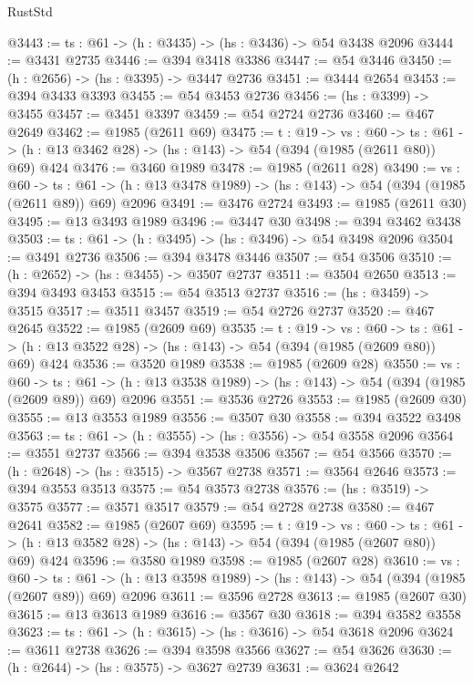 \begin{lexlean}{RustStd}
\begin{coremodule}
{\begin{coremodule}
{{{{{{{{@3443 := {ts : @61} -> (h : @3435) -> (hs : @3436) -> @54 @3438 @2096
@3444 := @3431 @2735
@3446 := @394 @3418 @3386
@3447 := @54 @3446
@3450 := (h : @2656) -> (hs : @3395) -> @3447 @2736
@3451 := @3444 @2654
@3453 := @394 @3433 @3393
@3455 := @54 @3453 @2736
@3456 := (hs : @3399) -> @3455
@3457 := @3451 @3397
@3459 := @54 @2724 @2736
@3460 := @467 @2649
@3462 := @1985 (@2611 @69)
@3475 := {t : @19} ->
  {vs : @60} ->
  {ts : @61} -> (h : @13 @3462 @28) -> (hs : @143) -> @54 (@394 (@1985 (@2611 @80)) @69) @424
@3476 := @3460 @1989
@3478 := @1985 (@2611 @28)
@3490 := {vs : @60} ->
  {ts : @61} -> (h : @13 @3478 @1989) -> (hs : @143) -> @54 (@394 (@1985 (@2611 @89)) @69) @2096
@3491 := @3476 @2724
@3493 := @1985 (@2611 @30)
@3495 := @13 @3493 @1989
@3496 := @3447 @30
@3498 := @394 @3462 @3438
@3503 := {ts : @61} -> (h : @3495) -> (hs : @3496) -> @54 @3498 @2096
@3504 := @3491 @2736
@3506 := @394 @3478 @3446
@3507 := @54 @3506
@3510 := (h : @2652) -> (hs : @3455) -> @3507 @2737
@3511 := @3504 @2650
@3513 := @394 @3493 @3453
@3515 := @54 @3513 @2737
@3516 := (hs : @3459) -> @3515
@3517 := @3511 @3457
@3519 := @54 @2726 @2737
@3520 := @467 @2645
@3522 := @1985 (@2609 @69)
@3535 := {t : @19} ->
  {vs : @60} ->
  {ts : @61} -> (h : @13 @3522 @28) -> (hs : @143) -> @54 (@394 (@1985 (@2609 @80)) @69) @424
@3536 := @3520 @1989
@3538 := @1985 (@2609 @28)
@3550 := {vs : @60} ->
  {ts : @61} -> (h : @13 @3538 @1989) -> (hs : @143) -> @54 (@394 (@1985 (@2609 @89)) @69) @2096
@3551 := @3536 @2726
@3553 := @1985 (@2609 @30)
@3555 := @13 @3553 @1989
@3556 := @3507 @30
@3558 := @394 @3522 @3498
@3563 := {ts : @61} -> (h : @3555) -> (hs : @3556) -> @54 @3558 @2096
@3564 := @3551 @2737
@3566 := @394 @3538 @3506
@3567 := @54 @3566
@3570 := (h : @2648) -> (hs : @3515) -> @3567 @2738
@3571 := @3564 @2646
@3573 := @394 @3553 @3513
@3575 := @54 @3573 @2738
@3576 := (hs : @3519) -> @3575
@3577 := @3571 @3517
@3579 := @54 @2728 @2738
@3580 := @467 @2641
@3582 := @1985 (@2607 @69)
@3595 := {t : @19} ->
  {vs : @60} ->
  {ts : @61} -> (h : @13 @3582 @28) -> (hs : @143) -> @54 (@394 (@1985 (@2607 @80)) @69) @424
@3596 := @3580 @1989
@3598 := @1985 (@2607 @28)
@3610 := {vs : @60} ->
  {ts : @61} -> (h : @13 @3598 @1989) -> (hs : @143) -> @54 (@394 (@1985 (@2607 @89)) @69) @2096
@3611 := @3596 @2728
@3613 := @1985 (@2607 @30)
@3615 := @13 @3613 @1989
@3616 := @3567 @30
@3618 := @394 @3582 @3558
@3623 := {ts : @61} -> (h : @3615) -> (hs : @3616) -> @54 @3618 @2096
@3624 := @3611 @2738
@3626 := @394 @3598 @3566
@3627 := @54 @3626
@3630 := (h : @2644) -> (hs : @3575) -> @3627 @2739
@3631 := @3624 @2642
}}}}}}}}
\end{coremodule}}
\end{coremodule}
\end{lexlean}
